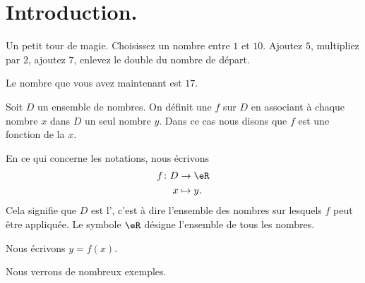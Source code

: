 
\section{Introduction.}


\begin{example} \label{ExemVmCkIH}
    Un petit tour de magie. Choisissez un nombre entre \( 1\) et \( 10\). Ajoutez \( 5\), multipliez par \( 2\), ajoutez \( 7\), enlevez le double du nombre de départ.

    Le nombre que vous avez maintenant est \( 17\).
\end{example}


\newpage


\newpage

\begin{definition}
    Soit \( D\) un ensemble de nombres. On définit une  \( f\) sur \( D\) en associant à chaque nombre \( x\) dans \( D\) un seul nombre \( y\). Dans ce cas nous disons que \( f\) est une fonction de la  \( x\).
\end{definition}

En ce qui concerne les notations, nous écrivons
\begin{equation}
    \begin{aligned}
        f\colon D&\to \eR \\
        x&\mapsto y. 
    \end{aligned}
\end{equation}
Cela signifie que \( D\) est l', c'est à dire l'ensemble des nombres sur lesquels \( f\) peut être appliquée. Le symbole \( \eR\) désigne l'ensemble de tous les nombres.

Nous écrivons \( y=f(x)\).

Nous verrons de nombreux exemples.

